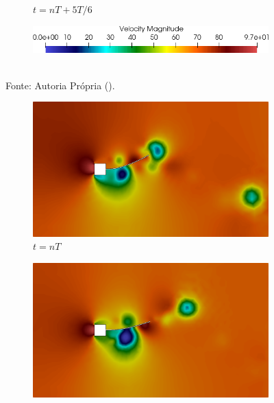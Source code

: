 \begin{figure}[h!]
\begin{subfigure}[b]{0.49\textwidth}
        \caption{$t=nT+5T/6$}
    \end{subfigure}
    \begin{subfigure}[b]{0.49\textwidth}
        \includegraphics[width=\linewidth]{Figuras/FSI-prism2/vLegenda.png}
    \end{subfigure}
    \\Fonte: Autoria Própria (\the\year).
    \label{fig:prismVel2}
\end{figure}

\begin{figure}[h!]
    \centering
    \caption{\textit{Flutter} em painel - Campo de pressões obtidos no problema de \textit{Flutter} em painel.}
    \begin{subfigure}[b]{0.49\textwidth}
        \includegraphics[width=\linewidth]{Figuras/FSI-prism2/pT1.png}
        \caption{$t=nT$}
    \end{subfigure}
    \begin{subfigure}[b]{0.49\textwidth}
        \includegraphics[width=\linewidth]{Figuras/FSI-prism2/pT2.png}

\end{subfigure}
\end{figure}
